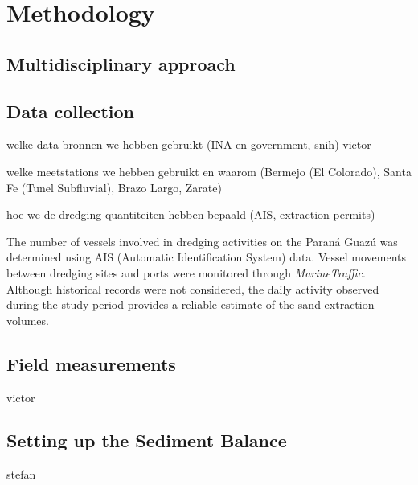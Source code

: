 \chapter{Methodology}

\section{Multidisciplinary approach}

\section{Data collection}

welke data bronnen we hebben gebruikt (INA en government, snih)
victor

welke meetstations we hebben gebruikt en waarom (Bermejo (El Colorado), Santa Fe (Tunel Subfluvial), Brazo Largo, Zarate)


hoe we de dredging quantiteiten hebben bepaald (AIS, extraction permits)

The number of vessels involved in dredging activities on the Paraná Guazú was determined using AIS (Automatic Identification System) data. Vessel movements between dredging sites and ports were monitored through \textit{MarineTraffic}. Although historical records were not considered, the daily activity observed during the study period provides a reliable estimate of the sand extraction volumes. 




\section{Field measurements}
victor

\section{Setting up the Sediment Balance}
stefan